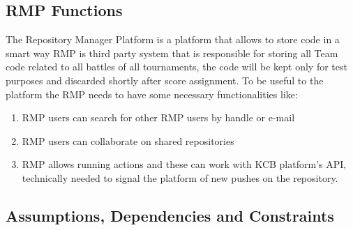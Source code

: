 \subsection{RMP Functions}
The Repository Manager Platform is a platform that allows to store code in a smart way
RMP is third party system that is responsible for storing all Team code related to all battles of all tournaments, the code will be kept only for test purposes and discarded shortly after score assignment. 
To be useful to the platform the RMP needs to have some necessary functionalities like:
\begin{enumerate}
    \item RMP users can search for other RMP users by handle or e-mail
    \item RMP users can collaborate on shared repositories
    \item RMP allows running actions and these can work with KCB platform's API, technically needed to signal the platform of new pushes on the repository.
\end{enumerate}


\subsection{Assumptions, Dependencies and Constraints}


